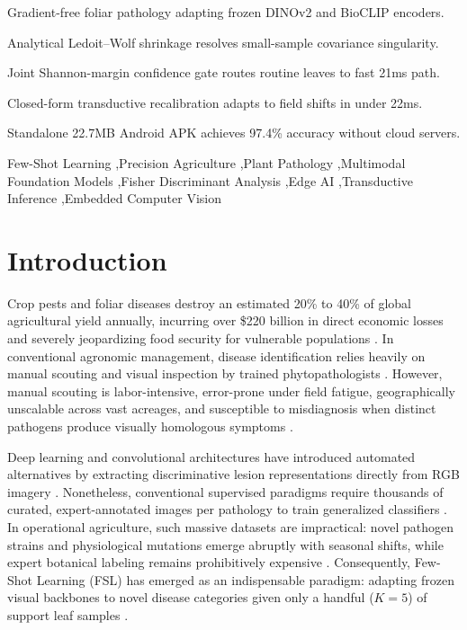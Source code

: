 \documentclass[a4paper,fleqn,nologo]{cas-dc}
\begin{document}
\begin{highlights}
\item Gradient-free foliar pathology adapting frozen DINOv2 and BioCLIP encoders.
\item Analytical Ledoit--Wolf shrinkage resolves small-sample covariance singularity.
\item Joint Shannon-margin confidence gate routes routine leaves to fast 21ms path.
\item Closed-form transductive recalibration adapts to field shifts in under 22ms.
\item Standalone 22.7MB Android APK achieves 97.4\% accuracy without cloud servers.
\end{highlights}

\begin{keywords}
Few-Shot Learning \sep Precision Agriculture \sep Plant Pathology \sep Multimodal Foundation Models \sep Fisher Discriminant Analysis \sep Edge AI \sep Transductive Inference \sep Embedded Computer Vision
\end{keywords}

\maketitle

\section{Introduction}
\label{sec:introduction}
Crop pests and foliar diseases destroy an estimated 20\% to 40\% of global agricultural yield annually, incurring over \$220 billion in direct economic losses and severely jeopardizing food security for vulnerable populations \cite{richard2022control}. In conventional agronomic management, disease identification relies heavily on manual scouting and visual inspection by trained phytopathologists \cite{khakimov2022traditional, shoaib2023advanced}. However, manual scouting is labor-intensive, error-prone under field fatigue, geographically unscalable across vast acreages, and susceptible to misdiagnosis when distinct pathogens produce visually homologous symptoms \cite{shoaib2023advanced}.

Deep learning and convolutional architectures have introduced automated alternatives by extracting discriminative lesion representations directly from RGB imagery \cite{shoaib2023advanced}. Nonetheless, conventional supervised paradigms require thousands of curated, expert-annotated images per pathology to train generalized classifiers \cite{shafik2023systematic}. In operational agriculture, such massive datasets are impractical: novel pathogen strains and physiological mutations emerge abruptly with seasonal shifts, while expert botanical labeling remains prohibitively expensive \cite{sun2024few}. Consequently, Few-Shot Learning (FSL) has emerged as an indispensable paradigm: adapting frozen visual backbones to novel disease categories given only a handful ($K=5$) of support leaf samples \cite{snell2017prototypical, sun2024few}.
\end{document}
